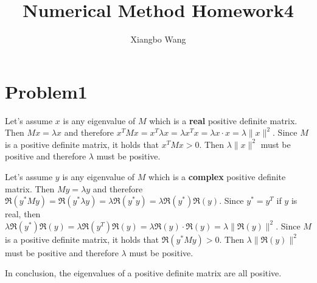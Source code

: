 \documentclass[11pt]{article}
\title{Numerical Method Homework4}
\author{Xiangbo Wang}
\begin{document}
	\maketitle
	\setlength{\parindent}{2em}
	
	\section{Problem1}
	\par Let's assume $x$ is any eigenvalue of $M$ which is a \textbf{real} positive definite matrix. Then $Mx = \lambda x$ and therefore $x^TMx = x^T\lambda x = \lambda x^Tx = \lambda x\cdot x = \lambda \|x\|^2$. Since $M$ is a positive definite matrix, it holds that $x^TMx > 0$. Then $\lambda \|x\|^2$ must be positive and therefore $\lambda$ must be positive.
	\par Let's assume $y$ is any eigenvalue of $M$ which is a \textbf{complex} positive definite matrix. Then $My = \lambda y$ and therefore $\Re(y^*My) = \Re(y^*\lambda y) = \lambda\Re(y^*y) = \lambda\Re(y^*)\Re(y)$. Since $y^* = y^T$ if $y$ is real, then $\lambda\Re(y^*)\Re(y) = \lambda \Re(y^T)\Re(y) = \lambda \Re(y)\cdot\Re(y) = \lambda \|\Re(y)\|^2$. Since $M$ is a positive definite matrix, it holds that $\Re(y^*My) > 0$. Then $\lambda \|\Re(y)\|^2$ must be positive and therefore $\lambda$ must be positive.
	\par In conclusion, the eigenvalues of a positive definite matrix are all positive.
	
\end{document}
